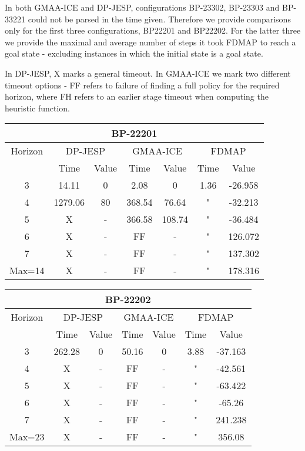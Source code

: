 \documentclass[letterpaper]{article} %
\begin{document}
In both GMAA-ICE and DP-JESP, configurations BP-23302, BP-23303 and BP-33221 could not be parsed in the time given. Therefore we provide comparisons only for the first three configurations, BP22201 and BP22202. For the latter three we provide the maximal and average number of steps it took FDMAP to reach a goal state - excluding instances in which the initial state is a goal state.

In DP-JESP, X marks a general timeout. In GMAA-ICE we mark two different timeout options - FF refers to failure of finding a full policy for the required horizon, where FH refers to an earlier stage timeout when computing the heuristic function.

\begin{center}
    \begin{tabular}{||c|c|c|c|c|c|c||}
         \hline
         \multicolumn{7}{||c||}{BP-22201} \\
         \hline
         Horizon & \multicolumn{2}{|c|}{DP-JESP} & \multicolumn{2}{|c|}{GMAA-ICE} & \multicolumn{2}{|c||}{FDMAP}\\ 
         \hline
         & Time & Value & Time & Value & Time & Value \\
         \hline
         3 & 14.11 & 0 & 2.08 & 0 & 1.36 & -26.958 \\
         \hline
         4 & 1279.06 & 80 & 368.54 & 76.64 & " & -32.213 \\
         \hline
         5 & X & - & 366.58 & 108.74 & " & -36.484 \\ 
         \hline
         6 & X & - & FF & - & " & 126.072 \\
         \hline
         7 & X & - & FF & - & " & 137.302 \\
         \hline
         Max=14 & X & - & FF & - & " & 178.316 \\
         \hline
    \end{tabular}
\end{center}

\begin{center}
    \begin{tabular}{||c|c|c|c|c|c|c||}
         \hline
         \multicolumn{7}{||c||}{BP-22202} \\
         \hline
         Horizon & \multicolumn{2}{|c|}{DP-JESP} & \multicolumn{2}{|c|}{GMAA-ICE} & \multicolumn{2}{|c||}{FDMAP}\\ 
         \hline
         & Time & Value & Time & Value & Time & Value \\
         \hline
         3 & 262.28 & 0 & 50.16 & 0 & 3.88 & -37.163 \\
         \hline
         4 & X & - & FF & - & " & -42.561 \\
         \hline
         5 & X & - & FF & - & " & -63.422 \\ 
         \hline
         6 & X & - & FF & - & " & -65.26 \\
         \hline
         7 & X & - & FF & - & " & 241.238 \\
         \hline
         Max=23 & X & - & FF & - & " & 356.08 \\
         \hline
    \end{tabular}
\end{center}
\end{document}
